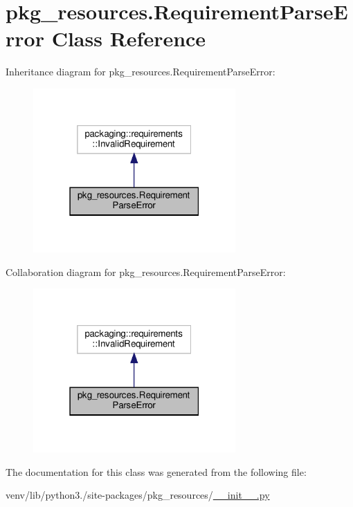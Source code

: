 \hypertarget{classpkg__resources_1_1RequirementParseError}{}\section{pkg\+\_\+resources.\+Requirement\+Parse\+Error Class Reference}
\label{classpkg__resources_1_1RequirementParseError}


Inheritance diagram for pkg\+\_\+resources.\+Requirement\+Parse\+Error\+:
\nopagebreak
\begin{figure}[H]
\begin{center}
\leavevmode
\includegraphics[width=219pt]{classpkg__resources_1_1RequirementParseError__inherit__graph}
\end{center}
\end{figure}


Collaboration diagram for pkg\+\_\+resources.\+Requirement\+Parse\+Error\+:
\nopagebreak
\begin{figure}[H]
\begin{center}
\leavevmode
\includegraphics[width=219pt]{classpkg__resources_1_1RequirementParseError__coll__graph}
\end{center}
\end{figure}


The documentation for this class was generated from the following file\+:\begin{DoxyCompactItemize}
\item 
venv/lib/python3./site-\/packages/pkg\+\_\+resources/\hyperlink{venv_2lib_2python3_89_2site-packages_2pkg__resources_2____init_____8py}{\+\_\+\+\_\+init\+\_\+\+\_\+.\+py}\end{DoxyCompactItemize}
